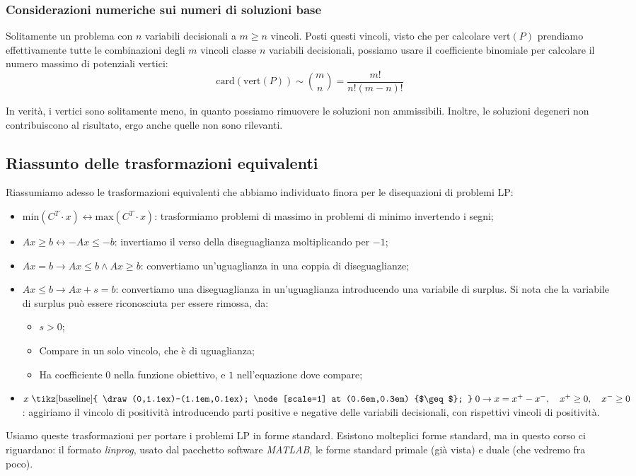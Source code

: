 \documentclass[a4paper,11pt]{article}
\begin{document}
\subsubsection{Considerazioni numeriche sui numeri di soluzioni base}
Solitamente un problema con $n$ variabili decisionali a $m \geq n$ vincoli.
Posti questi vincoli, visto che per calcolare $\mathrm{vert}(P)$ prendiamo effettivamente tutte le combinazioni degli $m$ vincoli classe $n$ variabili decisionali, possiamo usare il coefficiente binomiale per calcolare il numero massimo di potenziali vertici: 
$$ \mathrm{card}(\mathrm{vert}(P)) \sim \binom{m}{n} = \frac{m!}{n!(m-n)!} $$

In verità, i vertici sono solitamente meno, in quanto possiamo rimuovere le soluzioni non ammissibili.
Inoltre, le soluzioni degeneri non contribuiscono al risultato, ergo anche quelle non sono rilevanti.

\subsection{Riassunto delle trasformazioni equivalenti}
Riassumiamo adesso le trasformazioni equivalenti che abbiamo individuato finora per le disequazioni di problemi LP:
\begin{itemize}
	\item $\mathrm{min}(C^T \cdot x) \leftrightarrow \mathrm{max}(C^T \cdot x)$: trasformiamo problemi di massimo in problemi di minimo invertendo i segni;
	\item $Ax \geq b \leftrightarrow -Ax \leq -b$: invertiamo il verso della diseguaglianza moltiplicando per $-1$;
	\item $Ax = b \rightarrow Ax \leq b \wedge Ax \geq b$: convertiamo un'uguaglianza in una coppia di diseguaglianze;
	\item $Ax \leq b \rightarrow Ax + s = b$: convertiamo una diseguaglianza in un'uguaglianza introducendo una variabile di surplus. Si nota che la variabile di surplus può essere riconosciuta per essere rimossa, da:
		\begin{itemize}
			\item $s > 0$;
			\item Compare in un solo vincolo, che è di uguaglianza;
			\item Ha coefficiente $0$ nella funzione obiettivo, e $1$ nell'equazione dove compare;
		\end{itemize}
	\item $ x \mathrel{\text{\tikz[baseline]{
    \draw (0,1.1ex)--(1.1em,0.1ex);
    \node[scale=1] at (0.6em,0.3em) {$\geq$};
  }}} 0 \rightarrow x = x^+ - x^-, \quad x^+ \geq 0, \quad x^- \geq 0$: aggiriamo il vincolo di positività introducendo parti positive e negative delle variabili decisionali, con rispettivi vincoli di positività.
\end{itemize}

Usiamo queste trasformazioni per portare i problemi LP in forme standard.
Esistono molteplici forme standard, ma in questo corso ci riguardano: il formato \textit{linprog}, usato dal pacchetto software \textit{MATLAB}, le forme standard primale (già vista) e duale (che vedremo fra poco). 
\end{document}
